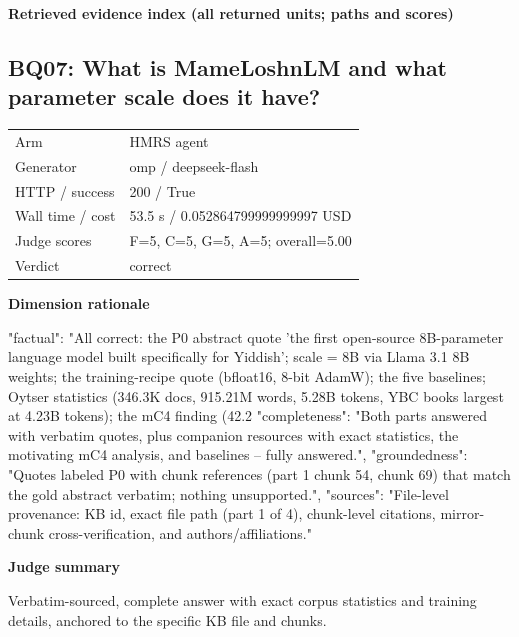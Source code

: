 \documentclass[10pt]{article}
\begin{document}
\textbf{Retrieved evidence index (all returned units; paths and scores) }
\begin{EvidenceText}
\end{EvidenceText}
\subsection{BQ07: What is MameLoshnLM and what parameter scale does it have?}
\begin{tabular}{@{}ll@{}}
Arm & HMRS agent\\
Generator & omp / deepseek-flash\\
HTTP / success & 200 / True\\
Wall time / cost & 53.5 s / 0.052864799999999997 USD\\
Judge scores & F=5, C=5, G=5, A=5; overall=5.00\\
Verdict & correct\\
\end{tabular}

\textbf{Dimension rationale}
\begin{EvidenceText}
{
  "factual": "All correct: the P0 abstract quote 'the first open-source 8B-parameter language model built specifically for Yiddish'; scale = 8B via Llama 3.1 8B weights; the training-recipe quote (bfloat16, 8-bit AdamW); the five baselines; Oytser statistics (346.3K docs, 915.21M words, 5.28B tokens, YBC books largest at 4.23B tokens); the mC4 finding (42.2%
  "completeness": "Both parts answered with verbatim quotes, plus companion resources with exact statistics, the motivating mC4 analysis, and baselines -- fully answered.",
  "groundedness": "Quotes labeled P0 with chunk references (part 1 chunk 54, chunk 69) that match the gold abstract verbatim; nothing unsupported.",
  "sources": "File-level provenance: KB id, exact file path (part 1 of 4), chunk-level citations, mirror-chunk cross-verification, and authors/affiliations."
}
\end{EvidenceText}

\textbf{Judge summary}
\begin{EvidenceText}
Verbatim-sourced, complete answer with exact corpus statistics and training details, anchored to the specific KB file and chunks.
\end{EvidenceText}
\end{document}
